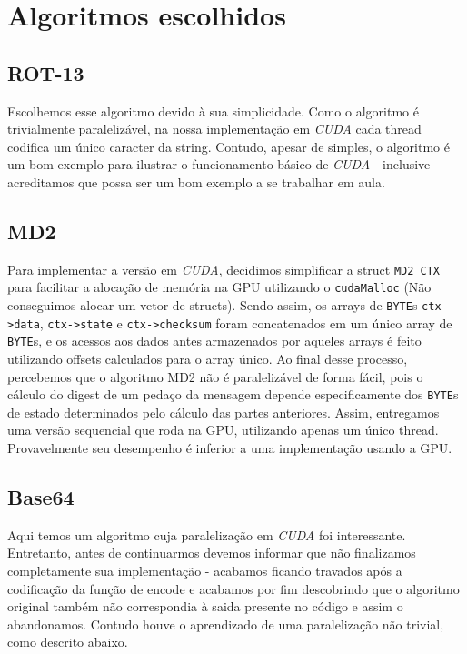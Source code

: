 \documentclass[final,12pt,a4paper]{elsarticle}
\begin{document}
\section{Algoritmos escolhidos}

\subsection{ROT-13}
Escolhemos esse algoritmo devido à sua simplicidade. Como o algoritmo é trivialmente paralelizável, na nossa implementação em  \textit{CUDA} cada thread codifica um único caracter da string. Contudo, apesar de simples, o algoritmo é um bom exemplo para ilustrar o funcionamento básico de  \textit{CUDA} - inclusive acreditamos que possa ser um bom exemplo a se trabalhar em aula.

\subsection{MD2}
Para implementar a versão em \textit{CUDA}, decidimos simplificar a struct \texttt{MD2\_CTX} para facilitar a alocação de memória na GPU utilizando o \texttt{cudaMalloc} (Não conseguimos alocar um vetor de structs). Sendo assim, os arrays de \texttt{BYTE}s \texttt{ctx->data}, \texttt{ctx->state} e \texttt{ctx->checksum} foram concatenados em um único array de \texttt{BYTE}s, e os acessos aos dados antes armazenados por aqueles arrays é feito utilizando offsets calculados para o array único. 
Ao final desse processo, percebemos que o algoritmo MD2 não é paralelizável de forma fácil, pois o cálculo do digest de um pedaço da mensagem depende especificamente dos \texttt{BYTE}s de estado determinados pelo cálculo das partes anteriores. Assim, entregamos uma versão sequencial que roda na GPU, utilizando apenas um único thread. Provavelmente seu desempenho é inferior a uma implementação usando a GPU.

\subsection{Base64}

Aqui temos um algoritmo cuja paralelização em \textit{CUDA} foi interessante. Entretanto, antes de continuarmos devemos informar que não finalizamos completamente sua implementação - acabamos ficando travados após a codificação da função de encode e acabamos por fim descobrindo que o algoritmo original também não correspondia à saida presente no código e assim o abandonamos. Contudo houve o aprendizado de uma paralelização não trivial, como descrito abaixo.
\end{document}
